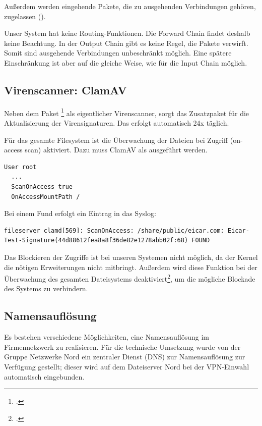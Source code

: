 Außerdem werden eingehende Pakete, die zu ausgehenden Verbindungen gehören, zugelassen ().

Unser System hat keine Routing-Funktionen. Die Forward Chain findet deshalb keine Beachtung. In der Output Chain gibt es keine Regel, die Pakete verwirft. Somit sind ausgehende Verbindungen unbeschränkt möglich. Eine spätere Einschränkung ist aber auf die gleiche Weise, wie für die Input Chain möglich.

\subsection{Virenscanner: ClamAV}
Neben dem Paket \footcite{clamAV} als eigentlicher Virenscanner, sorgt das Zusatzpaket  für die Aktualisierung der Virensignaturen. Das erfolgt automatisch 24x täglich.

Für das gesamte Filesystem ist die Überwachung der Dateien bei Zugriff (on-access scan) aktiviert. Dazu muss ClamAV als  ausgeführt werden.

\begin{lstlisting}[label=code:denyany,caption=Konfiguration in clamav.conf]
  User root
  ...
  ScanOnAccess true
  OnAccessMountPath /
\end{lstlisting}

Bei einem Fund erfolgt ein Eintrag in das Syslog:
\begin{lstlisting}[label=code:denyany,caption=Syslog Eintrag bei Virenfund]
  fileserver clamd[569]: ScanOnAccess: /share/public/eicar.com: Eicar-Test-Signature(44d88612fea8a8f36de82e1278abb02f:68) FOUND
\end{lstlisting}

Das Blockieren der Zugriffe ist bei unseren Systemen nicht möglich, da der Kernel die nötigen Erweiterungen nicht mitbringt. Außerdem wird diese Funktion bei der Überwachung des gesamten Dateisystems deaktiviert\footcite{clamAVnoOnAccess}, um die mögliche Blockade des Systems zu verhindern.

\subsection{Namensauflösung}
Es bestehen verschiedene Möglichkeiten, eine Namensauflösung im Firmennetzwerk zu realisieren. Für die technische Umsetzung wurde von der Gruppe Netzwerke Nord ein zentraler Dienst (DNS) zur Namensauflösung zur Verfügung gestellt; dieser wird auf dem Dateiserver Nord bei der VPN-Einwahl automatisch eingebunden.

